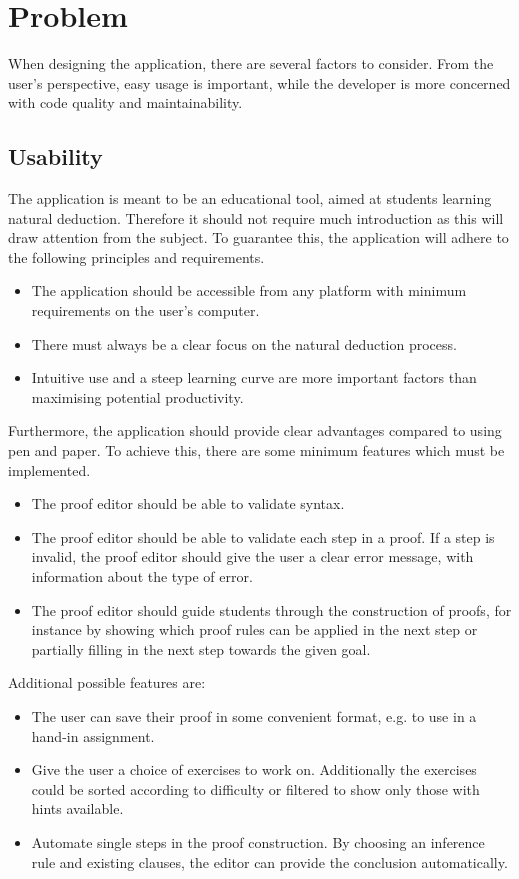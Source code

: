 \section{Problem}

When designing the application, there are several factors to consider. From the user's perspective, easy usage is important, while the developer is more concerned with code quality and maintainability.

\subsection{Usability}
The application is meant to be an educational tool, aimed at students learning natural deduction. Therefore it should not require much introduction as this will draw attention from the subject. To guarantee this, the application will adhere to the following principles and requirements.

\begin{itemize}
    \item The application should be accessible from any platform with minimum requirements on the user's computer.
    \item There must always be a clear focus on the natural deduction process.
    \item Intuitive use and a steep learning curve are more important factors than maximising potential productivity.
\end{itemize}

Furthermore, the application should provide clear advantages compared to using pen and paper. To achieve this, there are some minimum features which must be implemented.

\begin{itemize}
    \item The proof editor should be able to validate syntax.
    \item The proof editor should be able to validate each step in a proof. If a step is invalid, the proof editor should give the user a clear error message, with information about the type of error.
    \item The proof editor should guide students through the construction of proofs, for instance by showing which proof rules can be applied in the next step or partially filling in the next step towards the given goal.
\end{itemize}

Additional possible features are:
\begin{itemize}
    \item The user can save their proof in some convenient format, e.g. to use in a hand-in assignment.
    \item Give the user a choice of exercises to work on. Additionally the exercises could be sorted according to difficulty or filtered to show only those with hints available.
    \item Automate single steps in the proof construction. By choosing an inference rule and existing clauses, the editor can provide the conclusion automatically.
\end{itemize}

